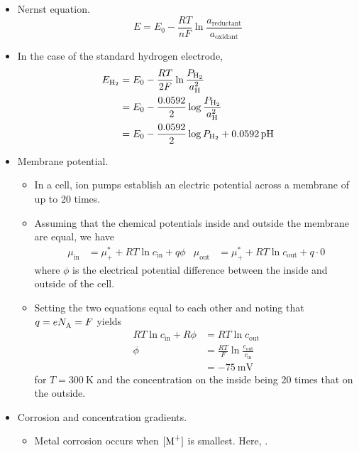 \documentclass[../notes.tex]{subfiles}
\begin{document}
\begin{itemize}
\begin{itemize}
\begin{itemize}
        \end{itemize}
    \end{itemize}
    \item Nernst equation.
    \begin{equation*}
        E = E_0-\frac{RT}{nF}\ln\frac{a_\text{reductant}}{a_\text{oxidant}}
    \end{equation*}
    \item In the case of the standard hydrogen electrode,
    \begin{align*}
        E_{\ce{H2}} &= E_0-\frac{RT}{2F}\ln\frac{P_{\ce{H2}}}{a_{\ce{H}}^2}\\
        &= E_0-\frac{0.0592}{2}\log\frac{P_{\ce{H2}}}{a_{\ce{H}}^2}\\
        &= E_0-\frac{0.0592}{2}\log P_{\ce{H2}}+0.0592\pH
    \end{align*}
    \item Membrane potential.
    \begin{itemize}
        \item In a cell, ion pumps establish an electric potential across a membrane of up to 20 times.
        \item Assuming that the chemical potentials inside and outside the membrane are equal, we have
        \begin{align*}
            \mu_\text{in} &= \mu_+^*+RT\ln c_\text{in}+q\phi&
            \mu_\text{out} &= \mu_+^*+RT\ln c_\text{out}+q\cdot 0
        \end{align*}
        where $\phi$ is the electrical potential difference between the inside and outside of the cell.
        \item Setting the two equations equal to each other and noting that $q=e{N_\text{A}^{}}=F$ yields
        \begin{align*}
            RT\ln c_\text{in}+R\phi &= RT\ln c_\text{out}\\
            \phi &= \frac{RT}{F}\ln\frac{c_\text{out}}{c_\text{in}}\\
            &= -\SI{75}{\milli\volt}
        \end{align*}
        for $T=\SI{300}{\kelvin}$ and the concentration on the inside being 20 times that on the outside.
    \end{itemize}
    \item Corrosion and concentration gradients.
    \begin{itemize}
        \item Metal corrosion occurs when $[\ce{M+}]$ is smallest. Here, .

\end{itemize}
\end{itemize}
\end{document}
